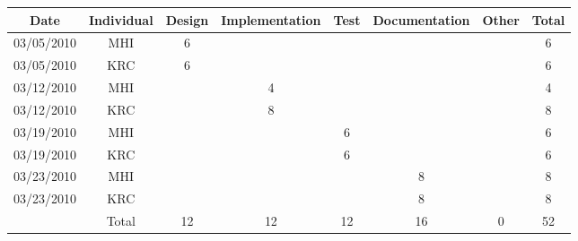\begin{tabular}{c|c|c|c|c|c|c|c}
Date & Individual & Design & Implementation & Test & Documentation & Other & Total\tabularnewline
\hline
\hline 
03/05/2010 & MHI & 6 &  &  &  &  & 6\tabularnewline
\hline 
03/05/2010 & KRC & 6 &  &  &  &  & 6\tabularnewline
\hline 
03/12/2010 & MHI &  & 4 &  &  &  & 4\tabularnewline
\hline 
03/12/2010 & KRC &  & 8 &  &  &  & 8\tabularnewline
\hline 
03/19/2010 & MHI &  &  & 6 &  &  & 6\tabularnewline
\hline 
03/19/2010 & KRC &  &  & 6 &  &  & 6\tabularnewline
\hline 
03/23/2010 & MHI &  &  &  & 8 &  & 8\tabularnewline
\hline 
03/23/2010 & KRC &  &  &  & 8 &  & 8\tabularnewline
\hline
\hline 
 & Total & 12 & 12 & 12 & 16 & 0 & 52\tabularnewline
\cline{2-8} 
\end{tabular}